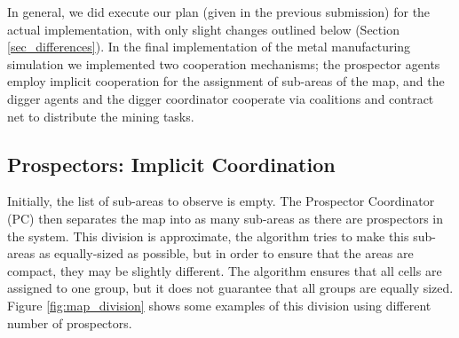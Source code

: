 In general, we did execute our plan (given in the previous submission) for the actual implementation, with only slight changes outlined below (Section \ref{sec_differences}). In the final implementation of the metal manufacturing simulation we implemented two cooperation mechanisms; the prospector agents employ implicit cooperation for the assignment of sub-areas of the map, and the digger agents and the digger coordinator cooperate via coalitions and contract net to distribute the mining tasks. 

\subsection{Prospectors: Implicit Coordination}

Initially, the list of sub-areas to observe is empty. The Prospector Coordinator (PC) then separates the map into as many sub-areas as there are prospectors in the system. This division is approximate, the algorithm tries to make this sub-areas as equally-sized as possible, but in order to ensure that the areas are compact, they may be slightly different. The algorithm ensures that all cells are assigned to one group, but it does not guarantee that all groups are equally sized. Figure \ref{fig:map_division} shows some examples of this division using different number of prospectors.

